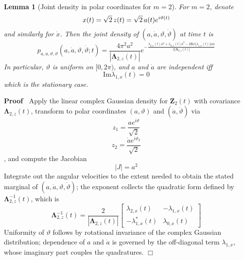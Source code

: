 \documentclass{article}
\newcommand{\tmmathbf}[1]{\ensuremath{\boldsymbol{#1}}}
\newenvironment{proof}{\noindent\textbf{Proof\ }}{\hspace*{\fill}$\Box$\medskip}
\newtheorem{lemma}{Lemma}
\begin{document}
\begin{lemma}
  [Joint density in polar coordinates for $m = 2$]\label{lem:polarJPDF} For $m
  = 2$, denote
  \begin{equation}
    x (t) = \sqrt{2}  \hspace{0.17em} z (t) = \sqrt{2}  \hspace{0.17em} a (t)
    e^{i \vartheta (t)}
  \end{equation}
  and similarly for $\dot{x}$. Then the joint density of $(a, \dot{a},
  \vartheta, \dot{\vartheta})$ at time $t$ is
  \begin{equation}
    \label{eq:jpdf_polar} p_{a, \dot{a}, \vartheta, \dot{\vartheta}} (a,
    \dot{a}, \vartheta, \dot{\vartheta} ; t) = \frac{4 \pi^2
    a^2}{|\tmmathbf{\Lambda}_{2, z} (t) |} e^{- \frac{\lambda_{2, x} (t) a^2 +
    \lambda_{0, x} (t)  \dot{a}^2 - 2 \mathrm{Re} \{\lambda_{1, x} (t)\} a
    \dot{a}}{2 |\tmmathbf{\Lambda}_{2, z} (t) |}}
  \end{equation}
  In particular, $\vartheta$ is uniform on $[0, 2 \pi)$, and $a$ and $\dot{a}$
  are independent iff
  \begin{equation}
    \mathrm{Im} \lambda_{1, x} (t) = 0
  \end{equation}
  which is the stationary case.
\end{lemma}

\begin{proof}
  Apply the linear complex Gaussian density for $\tmmathbf{Z}_2 (t)$ with
  covariance $\tmmathbf{\Lambda}_{2, z} (t)$, transform to polar coordinates
  $(a, \vartheta)$ and $(\dot{a}, \dot{\vartheta})$ via
  \begin{equation}
    z_1 = \frac{ae^{i \vartheta}}{\sqrt{2}}
  \end{equation}
  \begin{equation}
    z_2 = \frac{\dot{a} e^{i \vartheta_2}}{\sqrt{2}}
  \end{equation}
  , and compute the Jacobian
  \begin{equation}
    |J| = a^2
  \end{equation}
  Integrate out the angular velocities to the extent needed to obtain the
  stated marginal of $(a, \dot{a}, \vartheta, \dot{\vartheta})$; the exponent
  collects the quadratic form defined by $\tmmathbf{\Lambda}_{2, z}^{- 1}
  (t)$, which is
  \begin{equation}
    \tmmathbf{\Lambda}_{2, z}^{- 1} (t) = \frac{2}{|\tmmathbf{\Lambda}_{2, z}
    (t) |} \left[ \begin{array}{cc}
      \lambda_{2, x} (t) & - \lambda_{1, x} (t)\\
      - \lambda_{1, x}^{\ast} (t) & \lambda_{0, x} (t)
    \end{array} \right]
  \end{equation}
  Uniformity of $\vartheta$ follows by rotational invariance of the complex
  Gaussian distribution; dependence of $a$ and $\dot{a}$ is governed by the
  off-diagonal term $\lambda_{1, x}$, whose imaginary part couples the
  quadratures.
\end{proof}
\end{document}
